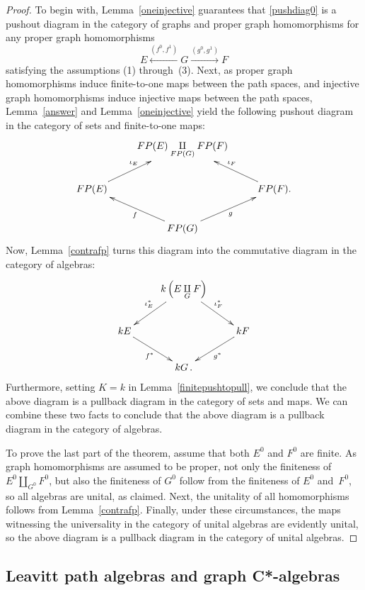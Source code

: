 \documentclass[12pt,times,a4paper]{amsart}
\numberwithin{equation}{section}
\numberwithin{equation}{section}
\begin{document}
\begin{proof}
To begin with,  Lemma~\ref{oneinjective} guarantees that \eqref{pushdiag0} is a pushout diagram in the 
category of graphs and proper graph homomorphisms for any proper graph homomorphisms
\begin{equation}
E\stackrel{(f^0,f^1)}{\longleftarrow} G\stackrel{(g^0,g^1)}{\longrightarrow} F
\end{equation}
 satisfying the assumptions
(1) through~(3). Next, as proper graph homomorphisms induce finite-to-one maps between the path spaces,
and injective graph homomorphisms induce injective maps between the path spaces,
 Lemma~\ref{answer} and Lemma~\ref{oneinjective} yield the following pushout diagram in the category of sets
and finite-to-one maps:
\begin{equation}
\xymatrix{
&
FP(E)\underset{FP(G)}{\amalg}FP(F)
&\\
FP(E)
\ar[ur]^{\iota_{E}}& & 
FP(F).
\ar[ul]_{\iota_{F}}\\
&
FP(G)
\ar[ur]_{g}\ar[ul]^{f}&
}
\end{equation}
Now, Lemma~\ref{contrafp}
 turns this diagram into the  commutative diagram in the category of algebras:
\begin{equation}
\xymatrix{
&
k\left(E\underset{G}{\amalg}F\right)
\ar[dl]_{\iota_E^*} \ar[dr]^{\iota_F^*}&\\
kE \ar[dr]_{f^*} & & 
kF\ar[dl]^{g^*}\\
&
kG\,.&}
\end{equation}
Furthermore, setting $K=k$ in Lemma~\ref{finitepushtopull}, we conclude that the above diagram is
a pullback diagram in the category of sets and maps.
We can combine these two facts to conclude that the above diagram is 
a pullback diagram in the category of algebras.

To prove the last part of the theorem, assume that both $E^0$ and $F^0$ are finite.
As graph homomorphisms are assumed to be proper, not only the finiteness of 
$E^0\amalg_{G^0}F^0$, but also the finiteness of $G^0$ follow from the finiteness of $E^0$ and~$F^0$,
so all algebras are unital, as claimed. Next, the unitality of all homomorphisms follows from
Lemma~\ref{contrafp}. Finally, under these circumstances, the maps witnessing the universality 
in the category of unital algebras are
evidently unital, so the above diagram is 
a pullback diagram in the category of unital algebras.
\end{proof}

\subsection{Leavitt path algebras and graph C*-algebras}
\end{document}
